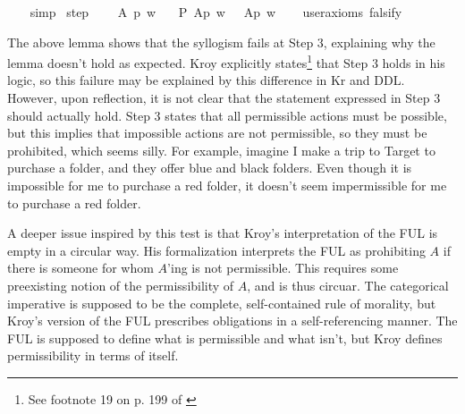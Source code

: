 \begin{isabellebody}
%
\isadelimproof
\ \ %
\endisadelimproof
%
\isatagproof
{}\isamarkupfalse%
\ simp\isanewline
%
%
\endisatagproof
{\isafoldproof}%
%
\isadelimproof
\isanewline
%
\endisadelimproof
\isanewline
{}\isamarkupfalse%
\ step{}{\isacharcolon}\ \isanewline
\ \ \ A\ p\ w\isanewline
\ \ \ {\isachardoublequoteopen}P\ {\isacharbraceleft}A{\isacharparenleft}p{\isacharparenright}{\isacharbraceright}\ w\ {\isasymlongrightarrow}\ {\isacharparenleft}{\isasymdiamond}\ {\isacharparenleft}A{\isacharparenleft}p{\isacharparenright}{\isacharparenright}\ w{\isacharparenright}{\isachardoublequoteclose}\isanewline
\ \ \isamarkupfalse%
\ {\isacharbrackleft}user{\isacharunderscore}axioms{\isacharcomma}\ falsify{\isacharbrackright}%
\isadelimproof
\ %
\endisadelimproof
%
\isatagproof
{}\isamarkupfalse%
\isanewline
%
%
\endisatagproof
{\isafoldproof}%
%
\isadelimproof
%
\endisadelimproof
%
\begin{isamarkuptext}%
The above lemma shows that the syllogism fails at Step 3, explaining why the lemma doesn't 
        hold as expected. Kroy explicitly states\footnote{See footnote 19 on p. 199 of \citet{kroy}} that 
        Step 3 holds in his logic, so this failure may be explained by this difference in Kr and DDL.
        However, upon reflection, it is not clear that the statement expressed in Step 3 should actually hold.
        Step 3 states that all permissible actions must be possible, but this implies that impossible
        actions are not permissible, so they must be prohibited, which seems silly. For example, 
        imagine I make a trip to Target to purchase a folder, and they offer blue and black folders. 
        Even though it is impossible for me to purchase a red folder, it doesn't seem impermissible
        for me to purchase a red folder.

        A deeper issue inspired by this test is that Kroy's interpretation of the FUL is 
        empty in a circular way. His formalization interprets the FUL as prohibiting $A$ if there is someone for whom 
        $A$'ing is not permissible. This requires some preexisting notion of the permissibility of $A$, and 
        is thus circuar. The categorical imperative is supposed to be the complete,
        self-contained rule of morality, but Kroy's version of the FUL prescribes obligations 
        in a self-referencing manner. The FUL is supposed to define what is permissible and what isn't, 
        but Kroy defines permissibility in terms of itself.
        

\end{isamarkuptext}
\end{isabellebody}
